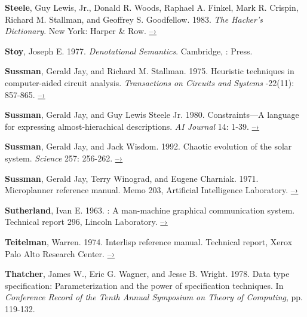 { \label{Steele et al. 1983}
\textbf{Steele}, Guy Lewis, Jr., Donald R. Woods, Raphael A.
Finkel, Mark R.  Crispin,
Richard M. Stallman, and Geoffrey S. Goodfellow.  1983.  \textit{The Hacker's
Dictionary}. New York: Harper \& Row.
\href{http://www.dourish.com/goodies/jargon.html}{–›}

 \label{Stoy 1977}
\textbf{Stoy}, Joseph E.  1977.  \textit{Denotational Semantics}.
Cambridge, :
 Press.

 \label{Sussman and Stallman 1975}
\textbf{Sussman}, Gerald Jay, and Richard M. Stallman.  1975.
Heuristic techniques in
computer-aided circuit analysis.  \textit{
  Transactions on Circuits
and Systems} -22(11): 857-865.
\href{http://dspace.mit.edu/handle/1721.1/5803}{–›}

 \label{Sussman and Steele 1980}
\textbf{Sussman}, Gerald Jay, and Guy Lewis Steele Jr.  1980.
Constraints---A language
for expressing almost-hierachical descriptions.  \textit{AI Journal} 14: 1-39.
\href{http://dspace.mit.edu/handle/1721.1/6312}{–›}

 \label{Sussman and Wisdom 1992}
\textbf{Sussman}, Gerald Jay, and Jack Wisdom.  1992. Chaotic
evolution of the solar
system.  \textit{Science} 257: 256-262.
\href{http://groups.csail.mit.edu/mac/users/wisdom/ss-chaos.pdf}{–›}

 \label{Sussman et al. (1971)}
\textbf{Sussman}, Gerald Jay, Terry Winograd, and Eugene Charniak.
1971.  Microplanner
reference manual.  Memo 203,  Artificial
Intelligence Laboratory.
\href{http://dspace.mit.edu/handle/1721.1/6184}{–›}

 \label{Sutherland (1963)}
\textbf{Sutherland}, Ivan E.  1963.  : A
man-machine graphical
communication system.  Technical report 296,  Lincoln Laboratory.
\href{https://www.cl.cam.ac.uk/techreports/UCAM-CL-TR-574.pdf}{–›}

 \label{Teitelman 1974}
\textbf{Teitelman}, Warren.  1974.  Interlisp reference manual.
Technical report, Xerox
Palo Alto Research Center.
\href{http://www.softwarepreservation.org/projects/LISP/interlisp/Interlisp-Oct_1974.pdf/view}{–›}

 \label{Thatcher et al. 1978}
\textbf{Thatcher}, James W., Eric G. Wagner, and Jesse B. Wright.
1978.  Data type
specification: Parameterization and the power of specification techniques. In
\textit{Conference Record of the Tenth Annual 
  Symposium on Theory
of Computing}, pp. 119-132.

}
